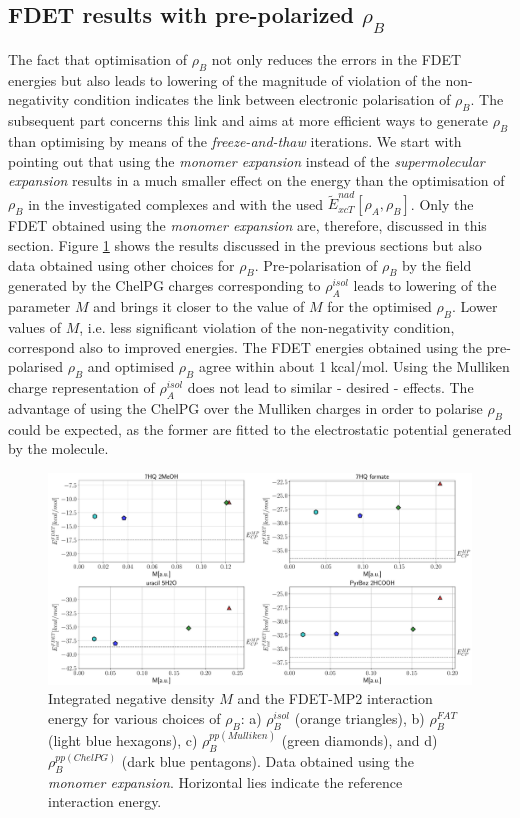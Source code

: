 \documentclass[amsmath,amssymb,preprint,aip,jcp]{revtex4-1}
\begin{document}

\subsection{FDET results with pre-polarized $\rho_B$}
The fact that optimisation of $\rho_B$ not only reduces the errors in the FDET energies but also leads to lowering of the magnitude of violation of the non-negativity condition indicates the link between electronic polarisation of $\rho_B$. 
The subsequent part concerns this link and aims at more efficient ways to generate $\rho_B$ than optimising by means of the {\it freeze-and-thaw} iterations. 
We start with pointing out that using the {\it monomer expansion} instead of the {\it supermolecular expansion} results in a much smaller effect on the energy than the optimisation of $\rho_B$ in the investigated complexes and with the used $\tilde{E}_{xcT}^{nad}[\rho_A,\rho_B]$. 
Only the FDET obtained using the {\it monomer expansion} are, therefore, discussed in this section.
Figure \ref{fig:M_vs_MP} shows the results discussed in the previous sections but also data obtained using other choices for $\rho_B$.
Pre-polarisation of $\rho_B$ by the field generated by the ChelPG charges corresponding to $\rho_A^{isol}$ leads to lowering of the parameter $M$ and brings it closer to the value of $M$ for the optimised $\rho_B$. 
Lower values of $M$, i.e. less significant violation of the non-negativity condition, correspond also to improved energies. 
The FDET energies obtained using the pre-polarised $\rho_B$ and optimised $\rho_B$ agree within about 1 kcal/mol.
Using the Mulliken charge representation of $\rho_A^{isol}$ does not lead to similar - desired - effects. 
The advantage of using the ChelPG over the Mulliken charges in order to polarise $\rho_B$ could be expected, as the former are fitted to the electrostatic potential generated by the molecule.
\begin{figure}
\centering
\includegraphics[width=1.0\linewidth]{M_vs_MP.pdf}
\caption{Integrated negative density $M$ and the FDET-MP2 interaction energy for various choices of $\rho_B$: a) $\rho_B^{isol}$ (orange triangles), b) $\rho_B^{FAT}$ (light blue hexagons), c) $\rho_B^{pp(Mulliken)}$ (green diamonds), and d) $\rho_B^{pp(ChelPG)}$ (dark blue pentagons). Data obtained using the {\it monomer expansion}. Horizontal lies indicate the reference interaction energy.}
\label{fig:M_vs_MP}
\end{figure}
\end{document}
